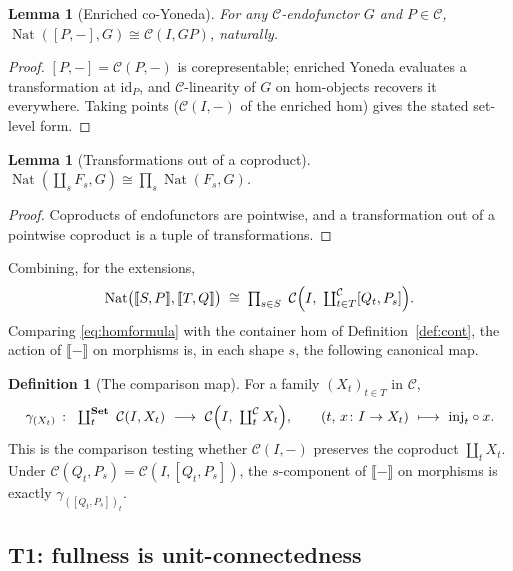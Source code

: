 \documentclass[11pt]{amsart}
\theoremstyle{plain}
\newtheorem{lemma}[theorem]{Lemma}
\theoremstyle{definition}
\newtheorem{definition}[theorem]{Definition}
\theoremstyle{remark}
\newcommand{\C}{\mathcal{C}}
\newcommand{\Set}{\mathbf{Set}}
\newcommand{\ext}[1]{\llbracket #1 \rrbracket}
\newcommand{\ihom}[2]{[#1,#2]}
\newcommand{\id}{\mathrm{id}}
\newcommand{\coprodd}{\textstyle\coprod}
\newcommand{\prodd}{\textstyle\prod}
\DeclareMathOperator{\Nat}{Nat}
\begin{document}
\begin{lemma}[Enriched co-Yoneda]\label{lem:coyoneda}
For any $\C$-endofunctor $G$ and $P\in\C$, $\Nat(\ihom{P}{-},G)\cong \C(I,GP)$, naturally.
\end{lemma}
\begin{proof}
$\ihom{P}{-}=\C(P,-)$ is corepresentable; enriched Yoneda evaluates a transformation at
$\id_P$, and $\C$-linearity of $G$ on hom-objects recovers it everywhere. Taking points
($\C(I,-)$ of the enriched hom) gives the stated set-level form.
\end{proof}

\begin{lemma}[Transformations out of a coproduct]\label{lem:natcoprod}
$\Nat(\coprodd_s F_s, G)\cong\prodd_s\Nat(F_s,G)$.
\end{lemma}
\begin{proof}
Coproducts of endofunctors are pointwise, and a transformation out of a pointwise coproduct is a
tuple of transformations.
\end{proof}

Combining, for the extensions,
\begin{equation}\label{eq:homformula}
\Nat\bigl(\ext{S,P},\ext{T,Q}\bigr)\;\cong\;\prodd_{s\in S}\ \C\Bigl(I,\ \coprodd^{\C}_{t\in T}\ihom{Q_t}{P_s}\Bigr).
\end{equation}
Comparing \eqref{eq:homformula} with the container hom of Definition~\ref{def:cont}, the action of
$\ext{-}$ on morphisms is, in each shape $s$, the following canonical map.

\begin{definition}[The comparison map]\label{def:gamma}
For a family $(X_t)_{t\in T}$ in $\C$,
\[
\gamma_{(X_t)}\ \colon\ \coprodd^{\Set}_{t}\ \C(I,X_t)\ \longrightarrow\ \C\Bigl(I,\ \coprodd^{\C}_{t}X_t\Bigr),
\qquad (t,\,x\colon I\to X_t)\ \longmapsto\ \mathrm{inj}_t\circ x .
\]
This is the comparison testing whether $\C(I,-)$ preserves the coproduct $\coprod_t X_t$. Under
$\C(Q_t,P_s)=\C(I,\ihom{Q_t}{P_s})$, the $s$-component of $\ext{-}$ on morphisms is exactly
$\gamma_{(\ihom{Q_t}{P_s})_t}$.
\end{definition}

\subsection{T1: fullness is unit-connectedness}\label{ss:T1}
\end{document}
